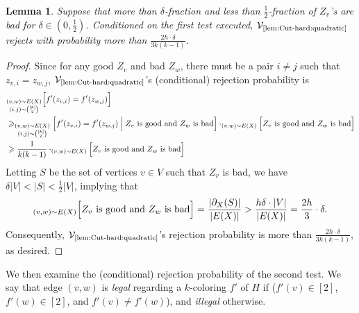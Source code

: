\documentclass[11pt,fleqn]{article}
\renewcommand{\geq}{\geqslant}
\newcommand{\V}{\calV}
\newcommand{\f}{f}
\newcommand{\Vquad}{\V_{\text{\ref{lem:Cut-hard:quadratic}}}}
\newcommand{\calV}{\mathcal{V}}
\let\Pr\relax\DeclareMathOperator*{\Pr}{\mathbb{P}}
\newtheorem{lemma}[theorem]{Lemma}
\theoremstyle{definition}
\numberwithin{equation}{section}
\begin{document}
\begin{lemma}
\label{lem:Cut-hard:quadratic:first}
Suppose that more than $\delta$-fraction and less than $\frac{1}{2}$-fraction of $Z_v$'s are bad for
$\delta \in \left(0,\frac{1}{2}\right)$.
Conditioned on the first test executed,
$\Vquad$ rejects with probability more than $\frac{2h \cdot \delta}{3k(k-1)}$.
\end{lemma}
\begin{proof} Since for any good $Z_v$ and bad $Z_w$,
there must be a pair $i \neq j$ such that
$z_{v,i} = z_{w,j}$,
$\Vquad$'s (conditional) rejection probability is 
\begin{align}
\begin{aligned}
    & \Pr_{\substack{(v,w) \sim E(X) \\ (i,j) \sim {[k] \choose 2}}}\Bigl[
        \f'(z_{v,i}) = \f'(z_{w,j})
    \Bigr] \\
    & \geq \Pr_{\substack{(v,w) \sim E(X) \\ (i,j) \sim {[k] \choose 2}}}\Bigl[
        \f'(z_{v,i}) = \f'(z_{w,j}) \Bigm| Z_v \text{ is good and } Z_w \text{ is bad}
    \Bigr]
    \cdot \Pr_{(v,w) \sim E(X)}\Bigl[
        Z_v \text{ is good and } Z_w \text{ is bad}
    \Bigr] \\
    & \geq \frac{1}{k(k-1)} \cdot
    \Pr_{(v,w) \sim E(X)}\Bigl[
        Z_v \text{ is good and } Z_w \text{ is bad}
    \Bigr]
\end{aligned}
\end{align}
Letting $S$ be the set of vertices $v \in V$ such that $Z_v$ is bad,
we have $\delta |V| < |S| < \frac{1}{2}|V| $, implying that
\begin{align}
\begin{aligned}
    \Pr_{(v,w) \sim E(X)}\Bigl[
        Z_v \text{ is good and } Z_w \text{ is bad}
    \Bigr]
    = \frac{|\partial_X(S)|}{|E(X)|}
    > \frac{h \delta \cdot |V|}{|E(X)|}
    = \frac{2h}{3} \cdot \delta.
\end{aligned}
\end{align}
Consequently, $\Vquad$'s rejection probability is more than $\frac{2h \cdot \delta}{3k(k-1)}$,
as desired.
\end{proof}




We then examine the (conditional) rejection probability of the second test.
We say that edge $(v,w)$ is \emph{legal} regarding a $k$-coloring $\f'$ of $H$ if
($\f'(v) \in [2]$, $\f'(w) \in [2]$, and $\f'(v) \neq \f'(w)$), and
\emph{illegal} otherwise.
\end{document}
